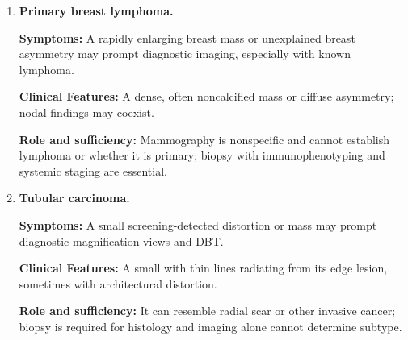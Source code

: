\begin{enumerate}[leftmargin=*,itemsep=0.45em,topsep=0.4em]
\item \textbf{Primary breast lymphoma.}\par\noindent\textbf{Symptoms:} A rapidly enlarging breast mass or unexplained breast asymmetry may prompt diagnostic imaging, especially with known lymphoma.\par\noindent\textbf{Clinical Features:} A dense, often noncalcified mass or diffuse asymmetry; nodal findings may coexist.\par\noindent\textbf{Role and sufficiency:} Mammography is nonspecific and cannot establish lymphoma or whether it is primary; biopsy with immunophenotyping and systemic staging are essential.
\item \textbf{Tubular carcinoma.}\par\noindent\textbf{Symptoms:} A small screening-detected distortion or mass may prompt diagnostic magnification views and DBT.\par\noindent\textbf{Clinical Features:} A small with thin lines radiating from its edge lesion, sometimes with architectural distortion.\par\noindent\textbf{Role and sufficiency:} It can resemble radial scar or other invasive cancer; biopsy is required for histology and imaging alone cannot determine subtype.
\end{enumerate}

